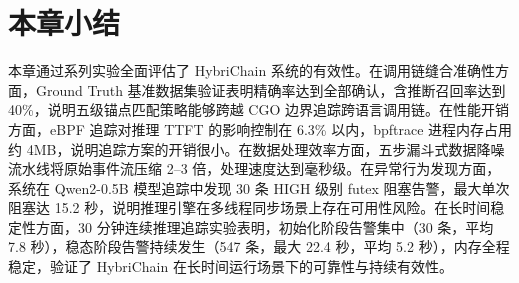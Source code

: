 \section{本章小结}

本章通过系列实验全面评估了 HybriChain 系统的有效性。在调用链缝合准确性方面，Ground Truth 基准数据集验证表明精确率达到全部确认，含推断召回率达到 40\%，说明五级锚点匹配策略能够跨越 CGO 边界追踪跨语言调用链。在性能开销方面，eBPF 追踪对推理 TTFT 的影响控制在 6.3\% 以内，bpftrace 进程内存占用约 4MB，说明追踪方案的开销很小。在数据处理效率方面，五步漏斗式数据降噪流水线将原始事件流压缩 2–3 倍，处理速度达到毫秒级。在异常行为发现方面，系统在 Qwen2-0.5B 模型追踪中发现 30 条 HIGH 级别 futex 阻塞告警，最大单次阻塞达 15.2 秒，说明推理引擎在多线程同步场景上存在可用性风险。在长时间稳定性方面，30 分钟连续推理追踪实验表明，初始化阶段告警集中（30 条，平均 7.8 秒），稳态阶段告警持续发生（547 条，最大 22.4 秒，平均 5.2 秒），内存全程稳定，验证了 HybriChain 在长时间运行场景下的可靠性与持续有效性。